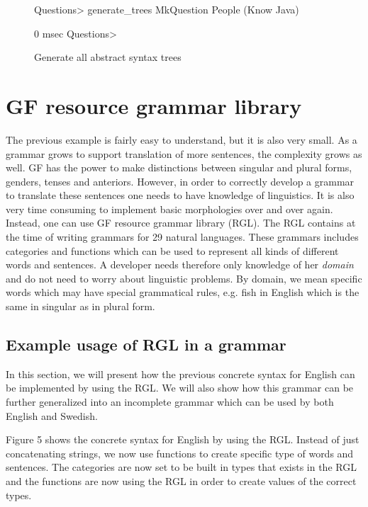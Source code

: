 \begin{figure}[H]
\begin{terminal}
Questions> generate_trees
MkQuestion People (Know Java)

0 msec
Questions> 
\end{terminal}

\caption{Generate all abstract syntax trees}
\end{figure}


\section{GF resource grammar library}

The previous example is fairly easy to understand, but it is also very small. As a grammar grows to support translation of more sentences, the complexity grows as well. GF has the power to make distinctions between singular and plural forms, genders, tenses and anteriors. However, in order to correctly develop a grammar to translate these sentences one needs to have knowledge of linguistics. It is also very time consuming to implement basic morphologies over and over again. Instead, one can use GF resource grammar library (RGL). The RGL contains at the time of writing grammars for 29 natural languages. These grammars includes categories and functions which can be used to represent all kinds of different words and sentences. A developer needs therefore only knowledge of her \emph{domain} and do not need to worry about linguistic problems. By domain, we mean specific words which may have special grammatical rules, e.g. fish in English which is the same in singular as in plural form.

\subsection{Example usage of RGL in a grammar}

In this section, we will present how the previous concrete syntax for English can be implemented by using the RGL. We will also show how this grammar can be further generalized into an incomplete grammar which can be used by both English and Swedish.

Figure 5 shows the concrete syntax for English by using the RGL. Instead of just concatenating strings, we now use functions to create specific type of words and sentences. The categories are now set to be built in types that exists in the RGL and the functions are now using the RGL in order to create values of the correct types.

